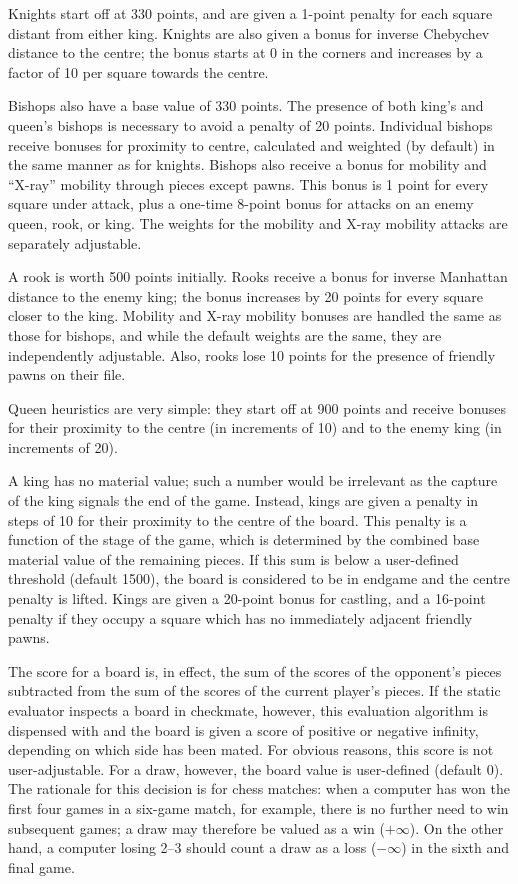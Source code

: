 \documentclass[a4paper]{article}
\begin{document}
Knights start off at 330 points, and are given a 1-point penalty for
each square distant from either king. Knights are also given a bonus
for inverse Chebychev distance to the centre; the bonus starts at 0 in
the corners and increases by a factor of 10 per square towards the
centre.

Bishops also have a base value of 330 points. The presence of both
king's and queen's bishops is necessary to avoid a penalty of 20
points. Individual bishops receive bonuses for proximity to centre,
calculated and weighted (by default) in the same manner as for
knights. Bishops also receive a bonus for mobility and ``X-ray''
mobility through pieces except pawns. This bonus is 1 point for every
square under attack, plus a one-time 8-point bonus for attacks on an
enemy queen, rook, or king. The weights for the mobility and X-ray
mobility attacks are separately adjustable.

A rook is worth 500 points initially. Rooks receive a bonus for
inverse Manhattan distance to the enemy king; the bonus increases by
20 points for every square closer to the king. Mobility and X-ray
mobility bonuses are handled the same as those for bishops, and while
the default weights are the same, they are independently adjustable.
Also, rooks lose 10 points for the presence of friendly pawns on their
file.

Queen heuristics are very simple: they start off at 900 points and
receive bonuses for their proximity to the centre (in increments of
10) and to the enemy king (in increments of 20).

A king has no material value; such a number would be irrelevant as the
capture of the king signals the end of the game. Instead, kings are
given a penalty in steps of 10 for their proximity to the centre of
the board. This penalty is a function of the stage of the game, which
is determined by the combined base material value of the remaining
pieces. If this sum is below a user-defined threshold (default 1500),
the board is considered to be in endgame and the centre penalty is
lifted. Kings are given a 20-point bonus for castling, and a 16-point
penalty if they occupy a square which has no immediately adjacent
friendly pawns.

The score for a board is, in effect, the sum of the scores of the
opponent's pieces subtracted from the sum of the scores of the current
player's pieces. If the static evaluator inspects a board in
checkmate, however, this evaluation algorithm is dispensed with and
the board is given a score of positive or negative infinity, depending
on which side has been mated. For obvious reasons, this score is not
user-adjustable. For a draw, however, the board value is user-defined
(default 0). The rationale for this decision is for chess matches:
when a computer has won the first four games in a six-game match, for
example, there is no further need to win subsequent games; a draw may
therefore be valued as a win ($+\infty$). On the other hand, a
computer losing 2--3 should count a draw as a loss ($-\infty$) in the
sixth and final game.
\end{document}
